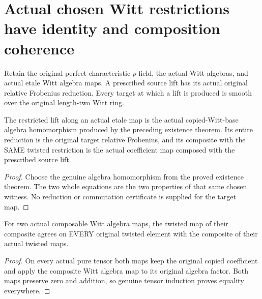 \section{Actual chosen Witt restrictions have identity and composition coherence}
\label{sec:witt-two-etale-restriction-coherence}

Retain the original perfect characteristic-$p$ field, the actual
Witt algebras, and actual etale Witt algebra maps. A prescribed
source lift has its actual original relative Frobenius reduction.
Every target at which a lift is produced is smooth over the
original length-two Witt ring.

\begin{definition}
\label{def:witt-two-chosen-etale-restricted-lift}
\leanok
The restricted lift along an actual etale map is the actual
copied-Witt-base algebra homomorphism produced by the preceding
existence theorem. Its entire reduction is the original target
relative Frobenius, and its composite with the SAME twisted
restriction is the actual coefficient map composed with the
prescribed source lift.
\end{definition}
\begin{proof}
Choose the genuine algebra homomorphism from the proved existence
theorem. The two whole equations are the two properties of that
same chosen witness. No reduction or commutation certificate is
supplied for the target map.
\end{proof}

\begin{lemma}
\label{lem:witt-two-original-twist-restriction-composition}
\leanok
For two actual composable Witt algebra maps, the twisted map of
their composite agrees on EVERY original twisted element with
the composite of their actual twisted maps.
\end{lemma}
\begin{proof}
On every actual pure tensor both maps keep the original copied
coefficient and apply the composite Witt algebra map to its
original algebra factor. Both maps preserve zero and addition,
so genuine tensor induction proves equality everywhere.
\end{proof}

